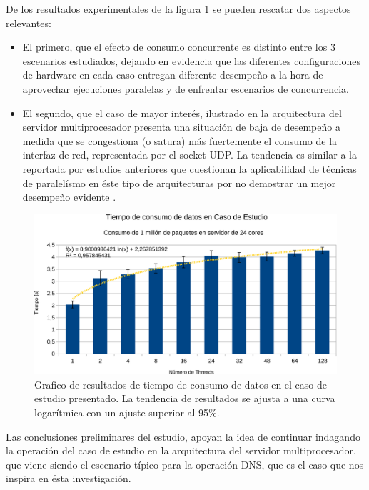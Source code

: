 De los resultados experimentales de la figura \ref{fig:tests_arch} se pueden rescatar dos aspectos relevantes:
\begin{itemize}
\item El primero, que el efecto de consumo concurrente es distinto entre los 3 escenarios estudiados, dejando en evidencia que las diferentes configuraciones de hardware en cada caso entregan diferente desempeño a la hora de aprovechar ejecuciones paralelas y de enfrentar escenarios de concurrencia.
\item El segundo, que el caso de mayor interés, ilustrado en la arquitectura del servidor multiprocesador presenta una situación de baja de desempeño a medida que se congestiona (o satura) más fuertemente el consumo de la interfaz de red, representada por el socket UDP. La tendencia es similar a la reportada por estudios anteriores que cuestionan la aplicabilidad de técnicas de paralelísmo en éste tipo de arquitecturas por no demostrar un mejor desempeño evidente \cite{post:facebook, paper:toshiba, tesis:diegoDCC}.
\end{itemize}

\begin{figure}[h!]
	\centering
	\includegraphics[scale=0.5]{resultados/transferenciaUDP2-crop.pdf}
	\caption{Grafico de resultados de tiempo de consumo de datos en el caso de estudio presentado. La tendencia de resultados se ajusta a una curva logarítmica con un ajuste superior al 95\%.}
	\label{fig:tests_arch}
\end{figure}

Las conclusiones preliminares del estudio, apoyan la idea de continuar indagando la operación del caso de estudio en la arquitectura del servidor multiprocesador, que viene siendo el escenario típico para la operación DNS, que es el caso que nos inspira en ésta investigación.


